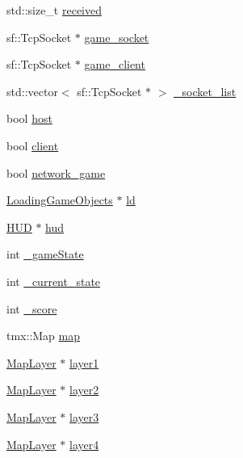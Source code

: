\begin{DoxyCompactItemize}
std\+::size\+\_\+t \hyperlink{classSekander_1_1GameState_a274e8d0ee8913f96c2973b34425c6d7f}{received}
\item 
sf\+::\+Tcp\+Socket $\ast$ \hyperlink{classSekander_1_1GameState_a2e6284526beda16cd853f964709a1dde}{game\+\_\+socket}
\item 
sf\+::\+Tcp\+Socket $\ast$ \hyperlink{classSekander_1_1GameState_ae85e17486292dcebc783c4cff136aea6}{game\+\_\+client}
\item 
std\+::vector$<$ sf\+::\+Tcp\+Socket $\ast$ $>$ \hyperlink{classSekander_1_1GameState_a930e32721a40b8e9f8eeaef3d1da9852}{\+\_\+socket\+\_\+list}
\item 
bool \hyperlink{classSekander_1_1GameState_aa0e1e7537cad0505a0ff751a5bca1cf3}{host}
\item 
bool \hyperlink{classSekander_1_1GameState_a4096b6555a755229b11091167b02c1f9}{client}
\item 
bool \hyperlink{classSekander_1_1GameState_a3f0cf150c794b1371bf2a20bf29d8463}{network\+\_\+game}
\item 
\hyperlink{classSekander_1_1LoadingGameObjects}{Loading\+Game\+Objects} $\ast$ \hyperlink{classSekander_1_1GameState_ad0cf3bf4943c3f025a9d46d1afc8f4ab}{ld}
\item 
\hyperlink{classSekander_1_1HUD}{H\+UD} $\ast$ \hyperlink{classSekander_1_1GameState_ab15428b5c508516dfb67eb4b5cdc313d}{hud}
\item 
int \hyperlink{classSekander_1_1GameState_a628790c63ef07329a39c322f370e52db}{\+\_\+game\+State}
\item 
int \hyperlink{classSekander_1_1GameState_a1722679ccb49b683a33dafbcc9cca6d7}{\+\_\+current\+\_\+state}
\item 
int \hyperlink{classSekander_1_1GameState_ac8ac6b28d48f95b723ec17ae37f7509e}{\+\_\+score}
\item 
tmx\+::\+Map \hyperlink{classSekander_1_1GameState_aa259af22c10b0f71cedc50c90a13b6ce}{map}
\item 
\hyperlink{classMapLayer}{Map\+Layer} $\ast$ \hyperlink{classSekander_1_1GameState_ae5ef3760e93eaa779734d0287dcca4fb}{layer1}
\item 
\hyperlink{classMapLayer}{Map\+Layer} $\ast$ \hyperlink{classSekander_1_1GameState_a4a24b0070e7d22098f6b057964cb0a91}{layer2}
\item 
\hyperlink{classMapLayer}{Map\+Layer} $\ast$ \hyperlink{classSekander_1_1GameState_aa6f018f199cabb2f40721403c62b308a}{layer3}
\item 
\hyperlink{classMapLayer}{Map\+Layer} $\ast$ \hyperlink{classSekander_1_1GameState_a69bd6996c7e1a849f95679bf93472407}{layer4}

\end{DoxyCompactItemize}
